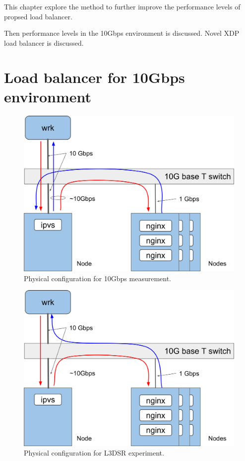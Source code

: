 This chapter explore the method to further improve the performance levels of propsed load balancer.

Then performance levels in the 10Gbps environment is discussed.
Novel XDP load balancer is discussed.

\section{Load balancer for 10Gbps environment}

\begin{figure}[h]
  \centering
  \includegraphics[width=0.8\columnwidth]{Figs/bench_10g}
  \caption{Physical configuration for 10Gbps measurement.}
  \label{fig:bench_10g}
\end{figure}

\begin{figure}[h]
  \centering
  \includegraphics[width=0.8\columnwidth]{Figs/bench_10g_l3dsr}
  \caption{Physical configuration for L3DSR experiment.}
  \label{fig:bench_10g_l3dsr}
\end{figure}


